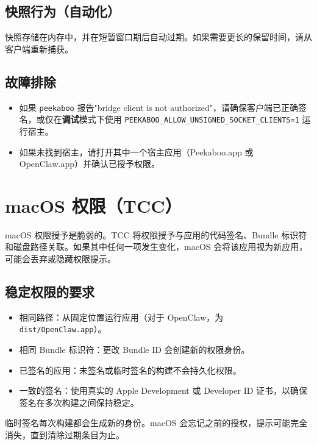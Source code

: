 \subsection{快照行为（自动化）}


快照存储在内存中，并在短暂窗口期后自动过期。如果需要更长的保留时间，请从客户端重新捕获。

\subsection{故障排除}


\begin{itemize}
  \item 如果 \texttt{peekaboo} 报告"bridge client is not authorized"，请确保客户端已正确签名，或仅在\textbf{调试}模式下使用 \texttt{PEEKABOO\_ALLOW\_UNSIGNED\_SOCKET\_CLIENTS=1} 运行宿主。
  \item 如果未找到宿主，请打开其中一个宿主应用（Peekaboo.app 或 OpenClaw.app）并确认已授予权限。
\end{itemize}



\clearpage

\section{macOS 权限（TCC）}


macOS 权限授予是脆弱的。TCC 将权限授予与应用的代码签名、Bundle 标识符和磁盘路径关联。如果其中任何一项发生变化，macOS 会将该应用视为新应用，可能会丢弃或隐藏权限提示。

\subsection{稳定权限的要求}


\begin{itemize}
  \item 相同路径：从固定位置运行应用（对于 OpenClaw，为 \texttt{dist/OpenClaw.app}）。
  \item 相同 Bundle 标识符：更改 Bundle ID 会创建新的权限身份。
  \item 已签名的应用：未签名或临时签名的构建不会持久化权限。
  \item 一致的签名：使用真实的 Apple Development 或 Developer ID 证书，以确保签名在多次构建之间保持稳定。
\end{itemize}


临时签名每次构建都会生成新的身份。macOS 会忘记之前的授权，提示可能完全消失，直到清除过期条目为止。

